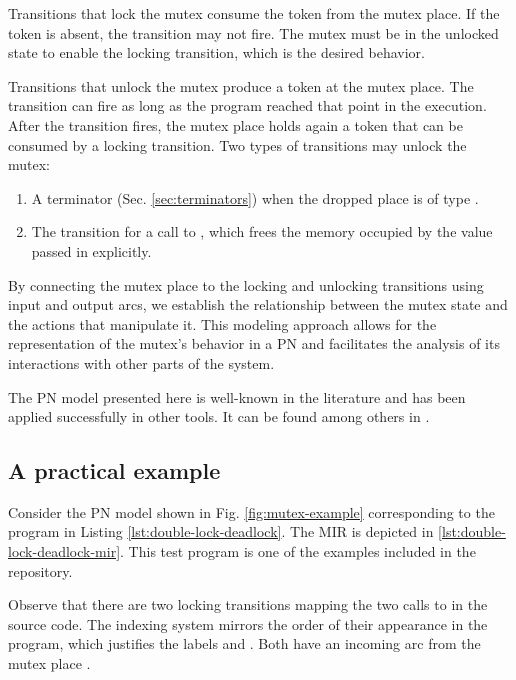 Transitions that lock the mutex consume the token from the mutex place.
If the token is absent, the transition may not fire.
The mutex must be in the unlocked state to enable the locking transition,
which is the desired behavior.

Transitions that unlock the mutex produce a token at the mutex place.
The transition can fire as long as the program reached that point in the execution.
After the transition fires, the mutex place holds again a token
that can be consumed by a locking transition.
Two types of transitions may unlock the mutex:

\begin{enumerate}
  \item A  terminator (Sec. \ref{sec:terminators})
        when the dropped place is of type .
  \item The transition for a call to ,
        which frees the memory occupied by the value passed in explicitly.
\end{enumerate}

By connecting the mutex place
to the locking and unlocking transitions using input and output arcs,
we establish the relationship between the mutex state and the actions that manipulate it.
This modeling approach allows for the representation of the mutex's behavior in a \acrshort{PN}
and facilitates the analysis of its interactions with other parts of the system.

The \acrshort{PN} model presented here is well-known in the literature
and has been applied successfully in other tools.
It can be found among others in \cite{kavi2002modeling,moshtaghi2001,meyer2020,zhang2022deadlocks}.

\subsection{A practical example}

Consider the \acrshort{PN} model shown in Fig. \ref{fig:mutex-example}
corresponding to the program in Listing \ref{lst:double-lock-deadlock}.
The \acrshort{MIR} is depicted in \ref{lst:double-lock-deadlock-mir}.
This test program is one of the examples included in the repository.

Observe that there are two locking transitions
mapping the two calls to  in the source code.
The indexing system mirrors the order of their appearance in the program,
which justifies the labels 
and .
Both have an incoming arc from the mutex place .

